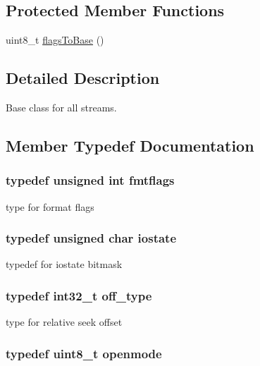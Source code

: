 \subsection*{Protected Member Functions}
\begin{DoxyCompactItemize}
\item 
uint8\-\_\-t \hyperlink{classios__base_ab499ea18fd1b51a9ac46b8cb85b10fca}{flags\-To\-Base} ()
\end{DoxyCompactItemize}


\subsection{Detailed Description}
Base class for all streams. 

\subsection{Member Typedef Documentation}
\hypertarget{classios__base_a975a829c0b5d999dd5bce3758b59da10}{
\subsubsection[{fmtflags}]{\setlength{\rightskip}{0pt plus 5cm}typedef unsigned int {\bf fmtflags}}}\label{classios__base_a975a829c0b5d999dd5bce3758b59da10}
type for format flags \hypertarget{classios__base_a67209c853f091390e1a08ac0b043fe11}{
\subsubsection[{iostate}]{\setlength{\rightskip}{0pt plus 5cm}typedef unsigned char {\bf iostate}}}\label{classios__base_a67209c853f091390e1a08ac0b043fe11}
typedef for iostate bitmask \hypertarget{classios__base_aa302457dd4c50f113d997fbf785a4bda}{
\subsubsection[{off\-\_\-type}]{\setlength{\rightskip}{0pt plus 5cm}typedef int32\-\_\-t {\bf off\-\_\-type}}}\label{classios__base_aa302457dd4c50f113d997fbf785a4bda}
type for relative seek offset \hypertarget{classios__base_a97a503456f60758f2c110f99b0ce0815}{
\subsubsection[{openmode}]{\setlength{\rightskip}{0pt plus 5cm}typedef uint8\-\_\-t {\bf openmode}}}\label{classios__base_a97a503456f60758f2c110f99b0ce0815}
